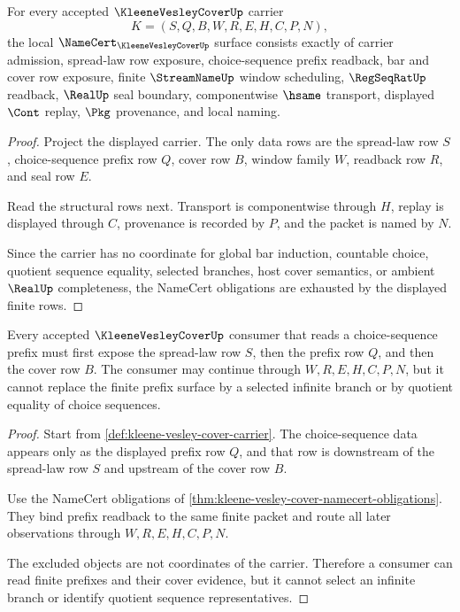 \begin{theorem}
\label{thm:kleene-vesley-cover-namecert-obligations}
For every accepted $\KleeneVesleyCoverUp$ carrier
$$
K=(S,Q,B,W,R,E,H,C,P,N),
$$
the local $\NameCert_{\KleeneVesleyCoverUp}$ surface consists exactly of carrier admission, spread-law row exposure, choice-sequence prefix readback, bar and cover row exposure, finite $\StreamNameUp$ window scheduling, $\RegSeqRatUp$ readback, $\RealUp$ seal boundary, componentwise $\hsame$ transport, displayed $\Cont$ replay, $\Pkg$ provenance, and local naming.
\end{theorem}
\begin{proof}
Project the displayed carrier. The only data rows are the spread-law row $S$, choice-sequence prefix row $Q$, cover row $B$, window family $W$, readback row $R$, and seal row $E$.

Read the structural rows next. Transport is componentwise through $H$, replay is displayed through $C$, provenance is recorded by $P$, and the packet is named by $N$.

Since the carrier has no coordinate for global bar induction, countable choice, quotient sequence equality, selected branches, host cover semantics, or ambient $\RealUp$ completeness, the NameCert obligations are exhausted by the displayed finite rows.
\end{proof}

\begin{theorem}
\label{thm:kleene-vesley-cover-choice-sequence-scope}
Every accepted $\KleeneVesleyCoverUp$ consumer that reads a choice-sequence prefix must first expose the spread-law row $S$, then the prefix row $Q$, and then the cover row $B$. The consumer may continue through $W,R,E,H,C,P,N$, but it cannot replace the finite prefix surface by a selected infinite branch or by quotient equality of choice sequences.
\end{theorem}
\begin{proof}
Start from \autoref{def:kleene-vesley-cover-carrier}. The choice-sequence data appears only as the displayed prefix row $Q$, and that row is downstream of the spread-law row $S$ and upstream of the cover row $B$.

Use the NameCert obligations of \autoref{thm:kleene-vesley-cover-namecert-obligations}. They bind prefix readback to the same finite packet and route all later observations through $W,R,E,H,C,P,N$.

The excluded objects are not coordinates of the carrier. Therefore a consumer can read finite prefixes and their cover evidence, but it cannot select an infinite branch or identify quotient sequence representatives.
\end{proof}

